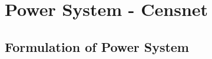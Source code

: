\chapter{Power System - Censnet} \label{cap:mpcc}

\section{Formulation of Power System} \label{sec:formulation}


